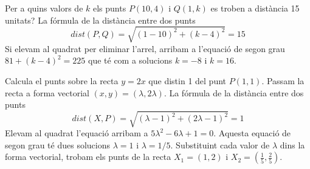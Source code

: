 \begin{resolt}[E]{Per a quins valors de $k$ els punts $P(10,4)$ i $Q(1,k)$ es troben a distància 15 unitats?}
	La fórmula de la distància entre dos punts
	\begin{equation*}
	dist(P,Q)=\sqrt{(1-10)^2+(k-4)^2}=15
	\end{equation*}
	Si elevam al quadrat per eliminar l'arrel, arribam a l'equació de segon grau $81+(k-4)^2=225$ que té com a solucions $k=-8$ i $k=16$.
\end{resolt}
\begin{resolt}{Calcula el punts sobre la recta $y=2x$ que distin 1 del punt $P(1,1)$.}
	Passam la recta a forma vectorial $(x,y)=(\lambda, 2\lambda)$. La fórmula de la distància entre dos punts
	\begin{equation*}
		dist(X,P)=\sqrt{(\lambda-1)^2+(2\lambda-1)^2}=1
	\end{equation*}
	Elevam al quadrat l'equació arribam a $5\lambda^2-6\lambda+1=0$. Aquesta equació de segon grau té dues solucions $\lambda=1$ i $\lambda=1/5$. Substituint cada valor de $\lambda$ dins la forma vectorial, trobam els punts de la recta $X_1=(1,2)$ i $X_2=(\frac{1}{5}, \frac{2}{5})$.
\end{resolt}

\pagebreak

